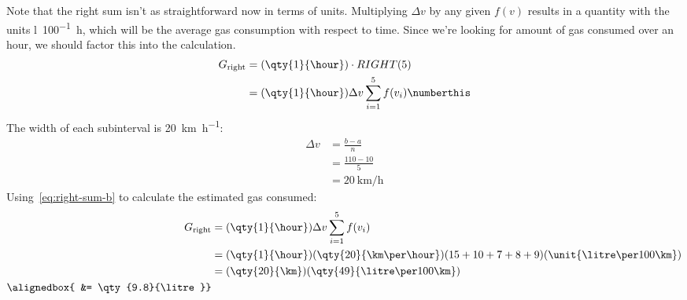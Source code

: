 \documentclass[
  coursecode={APSC 171},
  assignmentname={Week 6 Material - Defining and Estimating Integrals as Areas},
  solutiontitle=Solution,
  nodate,
  draft,
]{
  ltxanswer%
}
\begin{document}
\begin{questions}
\begin{parts}
\begin{solution}
        Note that the right sum isn't as straightforward now in terms of units. Multiplying \(\Delta v\) by any given \(f(v)\) results in a quantity with the units \unit{\litre\per100\hour}, which will be the average gas consumption with respect to time. Since we're looking for amount of gas consumed over an hour, we should factor this into the calculation.
        \begin{align*}
          G_{\text{right}} &= (\qty{1}{\hour}) \cdot RIGHT(5)                                                    \\
                           &= (\qty{1}{\hour}) \Delta v \sum_{i=1}^{5} f(v_{i})\numberthis\label{eq:right-sum-b}
        \end{align*}
        The width of each subinterval is \qty{20}{\km\per\hour}:
        \begin{align*}
          \Delta v &= \frac{b-a}{n}          \\
                   &= \frac{110-10}{5}       \\
                   &= \qty{20}{\km\per\hour}
        \end{align*}
        Using~\eqref{eq:right-sum-b} to calculate the estimated gas consumed:
        \begin{align*}
          G_{\text{right}} &= (\qty{1}{\hour}) \Delta v \sum_{i=1}^{5} f(v_{i})                                         \\
                           &= (\qty{1}{\hour}) (\qty{20}{\km\per\hour}) (15 + 10 + 7 + 8 + 9) (\unit{\litre\per100\km}) \\
                           &= (\qty{20}{\km}) (\qty{49}{\litre\per100\km})                                              \\
          \alignedbox{     &= \qty{9.8}{\litre}}
        \end{align*}
      \end{solution}
    \end{parts}

    \question{}\
    \begin{parts}

\end{parts}
\end{questions}
\end{document}
